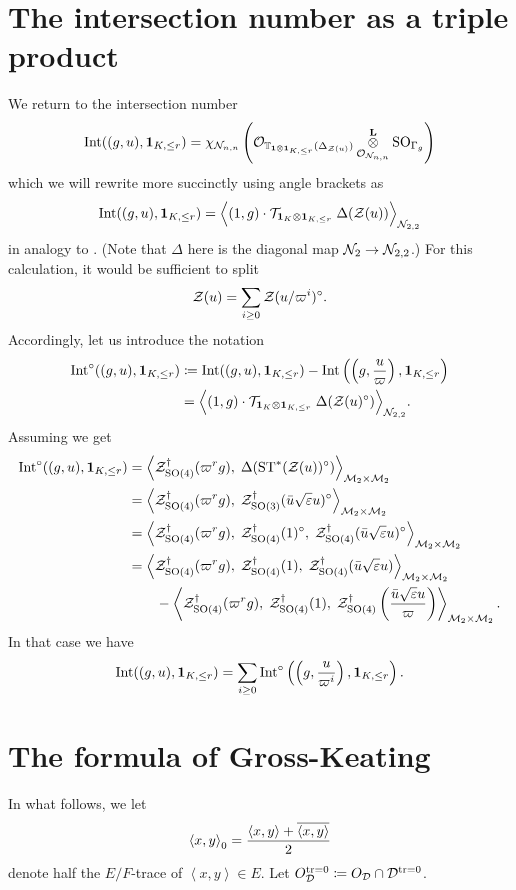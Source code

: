 \section{The intersection number as a triple product}
We return to the intersection number
\[ \Int((g,u), \fr) = \chi_{\RZ_{n,n}} \left(
      \Sheaf_{\TT_{\mathbf{1} \otimes \fr}(\Delta_{\ZD(u)})}
      \jiao_{\Sheaf_{\RZ_{n,n}}} \SO_{\Gamma_g} \right) \]
which we will rewrite more succinctly using angle brackets as
\[ \Int((g,u), \fr) = \Big\langle (1,g) \cdot \TTr \; \Delta(\ZD(u)) \Big\rangle_{\RZ_{2,2}} \]
in analogy to \cite[\S6.1]{ref:AFLspherical}.
(Note that $\Delta$ here is the diagonal map $\RZ_2 \to \RZ_{2,2}$.)
For this calculation, it would be sufficient to split
\[ \ZD(u) = \sum_{i \ge 0} \ZD(u/\varpi^i)^\circ. \]
Accordingly, let us introduce the notation
\begin{align*}
  \Int^\circ((g,u), \fr)
  &\coloneqq \Int((g,u), \fr) - \Int\left( \left( g, \frac{u}{\varpi} \right), \fr \right) \\
  &= \Big\langle (1,g) \cdot \TTr \; \Delta(\ZD(u)^\circ) \Big\rangle_{\RZ_{2,2}}.
\end{align*}
Assuming  we get
\begin{align*}
  \Int^\circ((g,u), \fr)
  &= \left< \ZO4(\varpi^r g), \; \Delta(\Serre^\ast(\ZD(u))^\circ) \right>_{\MM_2 \times \MM_2} \\
  &= \left< \ZO4(\varpi^r g), \; \ZO3(\bar u \sqrt{\eps} u)^\circ \right>_{\MM_2 \times \MM_2} \\
  &= \left< \ZO4(\varpi^r g), \; \ZO4(1)^\circ, \; \ZO4(\bar u \sqrt{\eps} u)^\circ \right>_{\MM_2 \times \MM_2} \\
  &= \left< \ZO4(\varpi^r g), \; \ZO4(1), \; \ZO4(\bar u \sqrt{\eps} u) \right>_{\MM_2 \times \MM_2} \\
  &\qquad- \left< \ZO4(\varpi^r g), \; \ZO4(1), \; \ZO4\left( \frac{\bar u \sqrt{\eps} u}{\varpi} \right) \right>_{\MM_2 \times \MM_2}.
\end{align*}
In that case we have
\begin{equation}
  \Int((g,u), \fr)
  = \sum_{i \ge 0} \Int^\circ\left( \left( g, \frac{u}{\varpi^i} \right), \fr \right).
  \label{eq:int_to_int_circ}
\end{equation}

\section{The formula of Gross-Keating}
\label{sec:GK}
In what follows, we let
\[ \left\langle x, y \right\rangle _0
  = \frac{\left\langle x,y \right\rangle + \ol{\left\langle x,y \right\rangle}}{2} \]
denote half the $E/F$-trace of $\left\langle x,y \right\rangle \in E$.
Let $\ODT \coloneqq \OO_\DD \cap \DT$.

